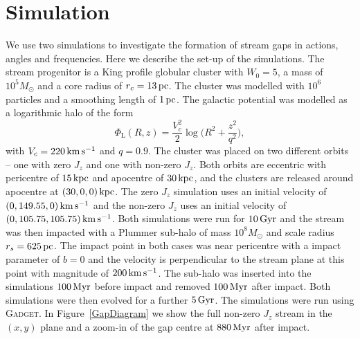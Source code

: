 \documentclass[useAMS,usenatbib,fleqn,a4paper]{mn2e}
\def\kpc{\,{\rm kpc}}
\def\pc{\,{\rm pc}}
\def\kms{\,{\rm km\,s^{-1}}}
\def\Gyr{\,{\rm Gyr}}
\def\Myr{\,{\rm Myr}}
\begin{document}
\section{Simulation}\label{sect::simulation}
We use two simulations to investigate the formation of stream gaps in actions, angles and frequencies. Here we describe the set-up of the simulations. The stream progenitor is a King profile globular cluster with $W_0=5$, a mass of $10^5 M_\odot$ and a core radius of $r_c=13\pc$. The cluster was modelled with $10^6$ particles and a smoothing length of $1\pc$.
The galactic potential was modelled as a logarithmic halo of the form
\begin{equation}
\Phi_\mathrm{L}(R,z) = \frac{V_c^2}{2}\log\Big(R^2+\frac{z^2}{q^2}\Big),
\end{equation}
with $V_c = 220\kms$ and $q = 0.9$. The cluster was placed on two different orbits -- one with zero $J_z$ and one with non-zero $J_z$. Both orbits are eccentric with pericentre of $15\kpc$ and apocentre of $30\kpc$, and the clusters are released around apocentre at $(30,0,0)\kpc$. The zero $J_z$ simulation uses an initial velocity of $(0,149.55,0)\kms$ and the non-zero $J_z$ uses an initial velocity of $(0, 105.75, 105.75)\kms$. Both simulations were run for $10\Gyr$ and the stream was then impacted with a Plummer sub-halo of mass $10^8M_\odot$ and scale radius $r_s=625\pc$. The impact point in both cases was near pericentre with a impact parameter of $b=0$ and the velocity is perpendicular to the stream plane at this point with magnitude of $200\kms$. The sub-halo was inserted into the simulations $100\Myr$ before impact and removed $100\Myr$ after impact. Both simulations were then evolved for a further $5\Gyr$. The simulations were run using \textsc{Gadget}. In Figure~\ref{GapDiagram} we show the full non-zero $J_z$ stream in the $(x,y)$ plane and a zoom-in of the gap centre at $880\Myr$ after impact.
\end{document}
